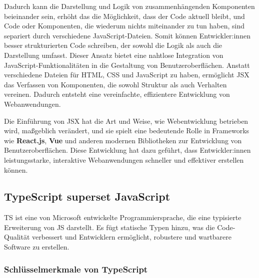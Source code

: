 Dadurch kann die Darstellung und Logik von zusammenhängenden Komponenten beieinander sein, erhöht das die Möglichkeit, dass der Code aktuell bleibt, und Code oder Komponenten, die wiederum nichts miteinander zu tun haben, sind separiert durch verschiedene JavaScript-Dateien. Somit können Entwickler:innen besser strukturierten Code schreiben, der sowohl die Logik als auch die Darstellung umfasst. Dieser Ansatz bietet eine nahtlose Integration von JavaScript-Funktionalitäten in die Gestaltung von Benutzeroberflächen. Anstatt verschiedene Dateien für \acs{HTML}, \acs{CSS} und JavaScript zu haben, ermöglicht \acs{JSX} das Verfassen von Komponenten, die sowohl Struktur als auch Verhalten vereinen. Dadurch entsteht eine vereinfachte, effizientere Entwicklung von Webanwendungen.

Die Einführung von \acs{JSX} hat die Art und Weise, wie Webentwicklung betrieben wird, maßgeblich verändert, und sie spielt eine bedeutende Rolle in Frameworks wie \textbf{React.js}, \textbf{Vue} und anderen modernen Bibliotheken zur Entwicklung von Benutzeroberflächen. Diese Entwicklung hat dazu geführt, dass Entwickler:innen leistungsstarke, interaktive Webanwendungen schneller und effektiver erstellen können.\cite{react-jsx-explained}

\subsection{TypeScript superset JavaScript}

\acf{TS} ist eine von Microsoft entwickelte Programmiersprache, die eine typisierte Erweiterung von \acl{JS} darstellt. Es fügt statische Typen hinzu, was die Code-Qualität verbessert und Entwicklern ermöglicht, robustere und wartbarere Software zu erstellen. \cite{typescript}

\subsubsection{Schlüsselmerkmale von TypeScript}

